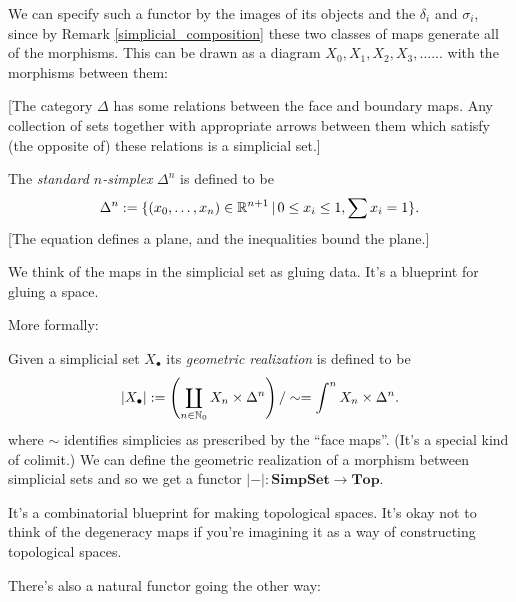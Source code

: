 \documentclass[class=report, crop=false,a4paper,twoside]{standalone}
\begin{document}
We can specify such a functor by the images of its objects and the $\delta_i$ and $\sigma_i$, since by Remark \ref{simplicial_composition} these two classes of maps generate all of the morphisms. This can be drawn as a diagram $X_0, X_1,X_2,X_3,\dots...$ with the morphisms between them:
\begin{center}
\end{center}

[The category $\Delta$ has some relations between the face and boundary maps. Any collection of sets together with appropriate arrows between them which satisfy (the opposite of) these relations is a simplicial set.]

\begin{definition}
	The \emph{standard $n$-simplex} $\Delta^n$ is defined to be
	\[
	\Delta^n := \{(x_0,\dots,x_n) \in \mathbb{R}^{n+1}\,|\, 0 \le x_i \le 1, \sum x_i = 1\}.
	\]
	[The equation defines a plane, and the inequalities bound the plane.]
\end{definition}

We think of the maps in the simplicial set as gluing data. It's a blueprint for gluing a space.

More formally:
\begin{definition}
	Given a simplicial set $X_\bullet$ its \emph{geometric realization} is defined to be
	\[
	|X_\bullet| := \left(\coprod_{n \in \mathbb{N}_0} X_n \times \Delta^n\right)/\sim = \int^n X_n \times \Delta^n.
	\]
	where $\sim$ identifies simplicies as prescribed by the ``face maps''. (It's a special kind of colimit.) We can define the geometric realization of a morphism between simplicial sets and so we get a functor $|-|: \mathbf{SimpSet} \to \mathbf{Top}$. 
\end{definition}

It's a combinatorial blueprint for making topological spaces. It's okay not to think of the degeneracy maps if you're imagining it as a way of constructing topological spaces.

There's also a natural functor going the other way:
\end{document}
